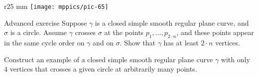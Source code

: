 \begin{wrapfigure}[5]{r}{25 mm}
\vskip-7mm
\centering
\texttt{[image: mppics/pic-65]}
\vskip0mm
\end{wrapfigure}

\begin{thm}{Advanced exercise}\label{ex:curve-crosses-circle}
Suppose $\gamma$ is a closed simple smooth regular plane curve, and $\sigma$ is a circle.
Assume $\gamma$ crosses $\sigma$ at the points $p_1,\dots,p_{2{\cdot} n}$, and these points appear in the same cycle order on $\gamma$ and on $\sigma$.
Show that $\gamma$ has at least $2\cdot n$ vertices.

Construct an example of a closed simple smooth regular plane curve $\gamma$ with only 4 vertices that crosses a given circle at arbitrarily many points. 
\end{thm}



